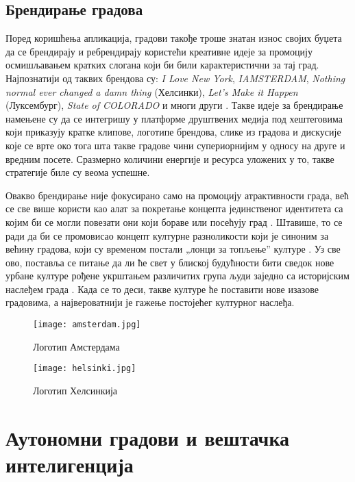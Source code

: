 \documentclass{article}
\begin{document}
\subsection{Брендирање градова}
Поред коришћења апликација, градови такође троше знатан износ својих буџета да се брендирају и ребрендирају користећи креативне идеје за промоцију осмишљавањем кратких слогана који би били карактеристични за тај град. Најпознатији од таквих брендова су: \textit{I Love New York}, \textit{IAMSTERDAM}, \textit{Nothing normal ever changed a damn thing} (Хелсинки), \textit{Let’s Make it Happen}  (Луксембург), \textit{State of COLORADO} и многи други \cite{theplace}. Такве идеје за брендирање намењене су да се интегришу у платформе друштвених медија под хештеговима који приказују кратке клипове, логотипе брендова, слике из градова и дискусије које се врте око тога шта такве градове чини супериорнијим у односу на друге и вредним посете. Сразмерно количини енергије и ресурса уложених у то, такве стратегије биле су веома успешне.

Овакво брендирање није фокусирано само на промоцију атрактивности града, већ се све више користи као алат за покретање концепта јединственог идентитета са којим би се могли повезати они који бораве или посећују град \cite{kavara}. Штавише, то се ради да би се промовисао концепт културне разноликости који је синоним за већину градова, који су временом постали „лонци за топљење” културе \cite{cotir}. Уз све ово, поставља се питање да ли ће свет у блиској будућности бити сведок нове урбане културе рођене укрштањем различитих група људи заједно са историјским наслеђем града \cite{burgess}. Када се то деси, такве културе ће поставити нове изазове градовима, а највероватнији је гажење постојећег културног наслеђа.

\begin{figure}[H]
\centering
\texttt{[image: amsterdam.jpg]}
\caption{Логотип Амстердама}
\end{figure}

\begin{figure}[H]
\centering
\texttt{[image: helsinki.jpg]}
\caption{Логотип Хелсинкија}
\end{figure}

\section{Аутономни градови и вештачка интелигенција}
\end{document}
